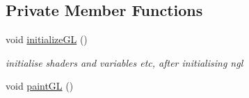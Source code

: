 \subsection*{Private Member Functions}
\begin{DoxyCompactItemize}
\item 
\hypertarget{class_n_g_l_scene_aab2b866db534d286a56cc2240ed98790}{void \hyperlink{class_n_g_l_scene_aab2b866db534d286a56cc2240ed98790}{initialize\-G\-L} ()}\label{class_n_g_l_scene_aab2b866db534d286a56cc2240ed98790}

\begin{DoxyCompactList}\small\item\em initialise shaders and variables etc, after initialising ngl \end{DoxyCompactList}\item 
\hypertarget{class_n_g_l_scene_a37bec65bfba7b7a717d803d369221e2d}{void \hyperlink{class_n_g_l_scene_a37bec65bfba7b7a717d803d369221e2d}{paint\-G\-L} ()}\label{class_n_g_l_scene_a37bec65bfba7b7a717d803d369221e2d}


\end{DoxyCompactItemize}
